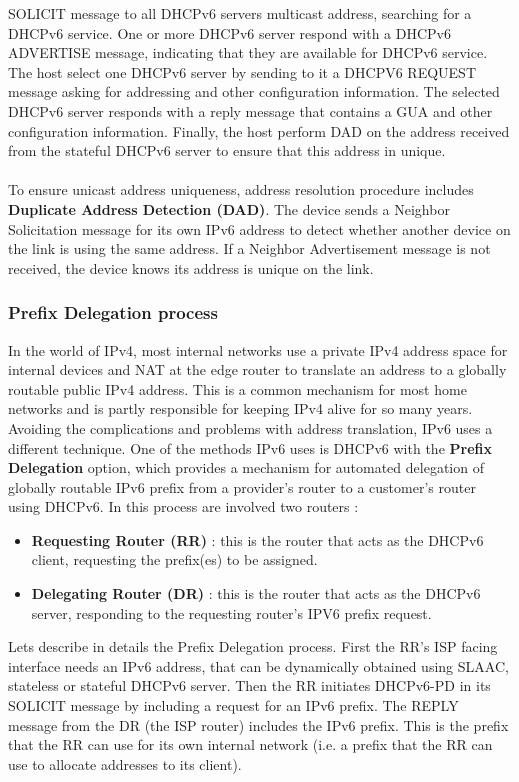 \documentclass[11pt]{article}
\begin{document}
SOLICIT message to all DHCPv6 servers multicast address, searching for a DHCPv6 service. One or more DHCPv6 server respond with a DHCPv6 ADVERTISE message, indicating that they are available for DHCPv6 service. The host select one DHCPv6 server by sending to it a DHCPV6 REQUEST message asking for addressing and other configuration information. The selected DHCPv6 server responds with a reply message that contains a GUA and other configuration information. Finally, the host perform DAD on the address received from the stateful DHCPv6 server to ensure that this address in unique.\\\\ To ensure unicast address uniqueness, address resolution procedure includes \textbf{Duplicate Address Detection (DAD)}. The device sends a Neighbor Solicitation message for its own IPv6 address to detect whether another device on the link is using the same address. If a Neighbor Advertisement message is not received, the device knows its address is unique on the link. 
\subsubsection{Prefix Delegation process}
In the world of IPv4, most internal networks use a private IPv4 address space for internal devices and NAT at the edge router to translate an address to a globally routable public IPv4 address. This is a common mechanism for most home networks and is partly responsible for keeping IPv4 alive for so many years. Avoiding the complications and problems with address translation, IPv6 uses a different technique. One of the methods IPv6 uses is DHCPv6 with the \textbf{Prefix Delegation} option, which provides a mechanism for automated delegation of globally routable IPv6 prefix from a provider's router to a customer's router using DHCPv6. In this process are involved two routers :
\begin{itemize}
\item \textbf{Requesting Router (RR)} : this is the router that acts as the DHCPv6 client, requesting the prefix(es) to be assigned.
\item \textbf{Delegating Router (DR)} : this is the router that acts as the DHCPv6 server, responding to the  requesting router's IPV6 prefix request.
\end{itemize}
Lets describe in details the Prefix Delegation process. First the RR's ISP facing interface needs an IPv6 address, that can be dynamically obtained using SLAAC, stateless or stateful DHCPv6 server. Then the RR initiates DHCPv6-PD in its SOLICIT message by including a request for an IPv6 prefix. The REPLY message from the DR (the ISP router) includes the IPv6 prefix. This is the prefix that the RR can use for its own internal network (i.e. a prefix that the RR can use to allocate addresses to its client).
\end{document}
